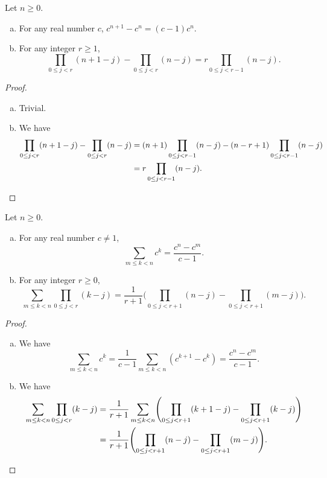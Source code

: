 \documentclass[11pt]{article}
\begin{document}
\begin{lemma}
  Let $n \geq 0$.
  \begin{enumerate}[(a)]
    \item For any real number $c$, $c^{n+1} - c^n = (c-1)c^n$.
    \item For any integer $r \geq 1$,
    \begin{equation*}
      \prod_{0 \leq j < r} (n+1-j) - \prod_{0 \leq j < r} (n-j) = r \prod_{0 \leq j < r-1} (n-j).
    \end{equation*}
  \end{enumerate}
\end{lemma}
\begin{proof}
  \leavevmode
  \begin{enumerate}[(a)]
    \item Trivial.
    \item We have
    \begin{align*}
      \prod_{0 \leq j < r} (n+1-j) - \prod_{0 \leq j < r} (n-j)
      &= (n+1) \prod_{0 \leq j < r-1} (n-j) - (n-r+1) \prod_{0 \leq j < r-1} (n-j) \\
      &= r \prod_{0 \leq j < r-1} (n-j).
      \qedhere
    \end{align*}
  \end{enumerate}
\end{proof}

\begin{theorem}
  Let $n \geq 0$.
  \begin{enumerate}[(a)]
    \item For any real number $c \neq 1$,
    \begin{equation*}
      \sum_{m \leq k < n} c^k = \frac{c^n - c^m}{c - 1}.
    \end{equation*}
    \item For any integer $r \geq 0$,
    \begin{equation*}
      \sum_{m \leq k < n} \prod_{0 \leq j < r} (k-j) = \frac{1}{r+1} \Biggl(\prod_{0 \leq j < r+1} (n-j) - \prod_{0 \leq j < r+1} (m-j)\Biggr).
    \end{equation*}
  \end{enumerate}
\end{theorem}
\begin{proof}
  \leavevmode
  \begin{enumerate}[(a)]
    \item We have
    \begin{equation*}
      \sum_{m \leq k < n} c^k
      = \frac{1}{c-1} \sum_{m \leq k < n} (c^{k+1} - c^k)
      = \frac{c^n - c^m}{c-1}.
    \end{equation*}
    \item We have
    \begin{align*}
      \sum_{m \leq k < n} \prod_{0 \leq j < r} (k-j)
      &= \frac{1}{r+1} \sum_{m \leq k < n} \Biggl(\prod_{0 \leq j < r+1} (k+1-j) - \prod_{0 \leq j < r+1} (k-j)\Biggr) \\
      &= \frac{1}{r+1} \Biggl(\prod_{0 \leq j < r+1} (n-j) - \prod_{0 \leq j < r+1} (m-j)\Biggr).
      \qedhere
    \end{align*}
  \end{enumerate}
\end{proof}
\end{document}
